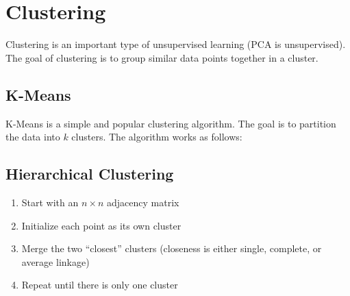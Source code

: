 \documentclass[10pt]{report}
\begin{document}
\chapter{Clustering}
Clustering is an important type of unsupervised learning (PCA is unsupervised). The goal of clustering is to group similar data points together in a cluster.

\section{K-Means}
K-Means is a simple and popular clustering algorithm. The goal is to partition the data into $k$ clusters. The algorithm works as follows:
\section{Hierarchical Clustering}
\begin{enumerate}
  \item Start with an $n \times n$ adjacency matrix
  \item Initialize each point as its own cluster
  \item Merge the two ``closest'' clusters (closeness is either single, complete, or average linkage)
  \item Repeat until there is only one cluster
\end{enumerate}
\end{document}
